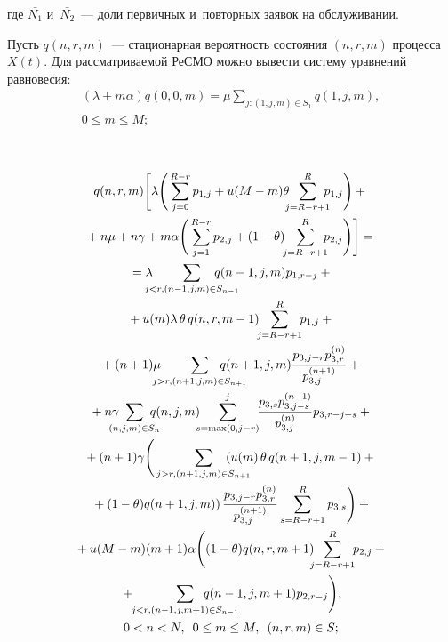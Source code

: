 \begin{multicols}{2}
\noindent
где $\bar{N_1}$ и~$\bar{N_2}$~--- доли первичных и~по\-втор\-ных заявок на 
обслуживании.


Пусть $q(n,r,m)$~--- стационарная ве\-ро\-ят\-ность со\-сто\-яния $(n,r,m)$ процесса~$X(t)$. 
Для рассматриваемой РеСМО мож\-но вывести сис\-те\-му уравнений рав\-но\-ве\-сия:
\begin{multline}
 (\lambda + m\alpha)q(0,0,m)=\mu \!\!\!\! \sum\limits_{j: (1,j,m) \in S_1} \!\!\!\!\!\! q\left(1,j,m\right), \\
  0  \leq m \leq M; 
  \label{eqn:sur}
\end{multline}

\vspace*{-15pt}
\columnbreak
\

\vspace*{-18pt}

\noindent
\begin{multline}
q(n,r,m) \Bigg[ \lambda \Bigg( \sum\limits_{j=0}^{R-r} p_{1,j} + u(M-m) \theta 
\!\! \!\sum\limits_{j=R-r+1}^R \!\!\!\! p_{1,j} \Bigg) +{}\\
{}+n\mu  + n\gamma + 
m\alpha \Bigg( \sum\limits_{j=1}^{R-r} p_{2,j} +(1-\theta) \!\! \sum\limits_{j=R-
r+1}^R \!\!\! p_{2,j} \Bigg) \Bigg] = {} \\
{}  = \lambda \!\! \!\!\! \sum\limits_{j<r, (n-1,j,m) \in S_{n-1}} \!\!\!\!\!\!\!\!\!\!\!\!\! q(n-
1,j,m)p_{1,r-j} + {}\\
{}+u(m) \lambda\, \theta\, q(n,r,m-1) \!\! \sum\limits_{j=R-r+1}^R \!\!
p_{1,j} +{} \\
{}+ (n+1)\mu \!\!\!\!\! \sum\limits_{j>r, (n+1,j,m) \in S_{n+1}} \!\!\!\!\!\!\!\!\!\!\!\!\!\!
q(n+1,j,m) \fr{p_{3,j-r} p_{3,r}^{(n)}}{ p_{3,j}^{(n+1)} } +{}\\
{}+  n\gamma \!\!\!\!\!\!
 \sum\limits_{(n,j,m) \in S_n} \!\!\!\!\!\! q(n,j,m) \!\!\! \sum\limits_{s=\max(0,j-r)}^j\!\! 
 \fr{p_{3,s} p_{3,j-s}^{(n-1)} }{ p_{3,j}^{(n)} }\,\! p_{3,r-j+s} + {} \\
{}+ (n+1)\gamma \Bigg( \sum\limits_{j>r, (n+1,j,m) \in S_{n+1}} \!\!\!\!\!\!\!\!\!\!\!\!\! \left( 
u(m)\,\theta \,q(n+1,j,m-1) +{}\right.\\
\left.{}+(1-\theta)q(n+1,j,m) \right) \fr{ p_{3,j-r}p_{3,r}^{(n)} }{ p_{3,j}^{(n+1)} } 
\sum\limits_{s=R-r+1}^R p_{3,s}  \Bigg) + {} \\
{}+ u(M-m)(m+1)\alpha \Bigg( (1-\theta)q(n,r,m+1) \!\!\!\sum\limits_{j=R-r+1}^R \!\! p_{2,j} + {}\\
{}+ \!\! \sum\limits_{j<r, (n-1,j,m+1) \in S_{n-1}} \!\! \!\!\!\!\!\!\!\!\!\! \!\! \!\! \!\!q(n-1,j,m+1)p_{2,r-j} \Bigg) ,  \\
0<n<N, \enskip 0 \leq m \leq M, \enskip (n,r,m) \in S; 
\end{multline}


\end{multicols}
